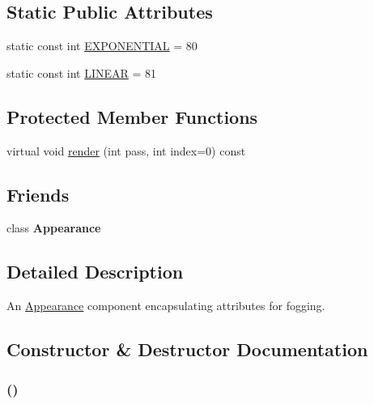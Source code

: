 \subsection*{Static Public Attributes}
\begin{CompactItemize}
\item 
static const int \hyperlink{classm3g_1_1Fog_86b391da2e58c0448712a10f6609a62c}{EXPONENTIAL} = 80
\item 
static const int \hyperlink{classm3g_1_1Fog_23ccf193c67257f1be26417041cecb31}{LINEAR} = 81
\end{CompactItemize}
\subsection*{Protected Member Functions}
\begin{CompactItemize}
\item 
virtual void \hyperlink{classm3g_1_1Fog_1efcb1973989d9963d5bd6d03065d389}{render} (int pass, int index=0) const 
\end{CompactItemize}
\subsection*{Friends}
\begin{CompactItemize}
\item 
\hypertarget{classm3g_1_1Fog_afa5201a494f65c37039281d9b63a2a9}{
class \textbf{Appearance}}
\label{classm3g_1_1Fog_afa5201a494f65c37039281d9b63a2a9}

\end{CompactItemize}


\subsection{Detailed Description}
An \hyperlink{classm3g_1_1Appearance}{Appearance} component encapsulating attributes for fogging. 

\subsection{Constructor \& Destructor Documentation}
\hypertarget{classm3g_1_1Fog_232ea9c5f5824d924fa185401fbfb234}{
\subsubsection[{Fog}]{ ()}}
\label{classm3g_1_1Fog_232ea9c5f5824d924fa185401fbfb234}


